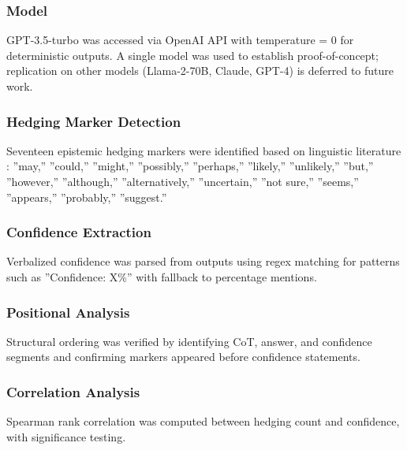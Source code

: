 \subsubsection{Model}

GPT-3.5-turbo was accessed via OpenAI API with temperature = 0 for deterministic outputs. A single model was used to establish proof-of-concept; replication on other models (Llama-2-70B, Claude, GPT-4) is deferred to future work.

\subsubsection{Hedging Marker Detection}

Seventeen epistemic hedging markers were identified based on linguistic literature \citep{hyland1998hedging}: ''may,'' ''could,'' ''might,'' ''possibly,'' ''perhaps,'' ''likely,'' ''unlikely,'' ''but,'' ''however,'' ''although,'' ''alternatively,'' ''uncertain,'' ''not sure,'' ''seems,'' ''appears,'' ''probably,'' ''suggest.''

\subsubsection{Confidence Extraction}

Verbalized confidence was parsed from outputs using regex matching for patterns such as ''Confidence: X\%'' with fallback to percentage mentions.

\subsubsection{Positional Analysis}

Structural ordering was verified by identifying CoT, answer, and confidence segments and confirming markers appeared before confidence statements.

\subsubsection{Correlation Analysis}

Spearman rank correlation was computed between hedging count and confidence, with significance testing.
